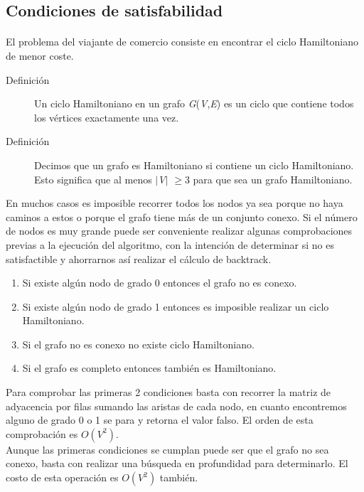 \documentclass[es]{ifirak}
\begin{document}
\subsection{Condiciones de satisfabilidad}
\large{
	\paragraph{}
	El problema del viajante de comercio consiste en encontrar el ciclo Hamiltoniano de menor coste.
	
	\begin{description}
		\item[Definición] Un ciclo Hamiltoniano en un grafo \textit{G}(\textit{V},\textit{E}) es un ciclo que contiene todos los vértices exactamente una vez.
		\item[Definición] Decimos que un grafo es Hamiltoniano si contiene un ciclo Hamiltoniano. Esto significa que al menos $|$\textit{V}$|$ $\geq$3 para que sea un grafo Hamiltoniano.\\
	\end{description}

	En muchos casos es imposible recorrer todos los nodos ya sea porque no haya caminos a estos o porque el grafo tiene más de un conjunto conexo. Si el número de nodos es muy grande puede ser conveniente realizar algunas comprobaciones previas a la ejecución del algoritmo, con la intención de determinar si no es satisfactible y ahorrarnos así realizar el cálculo de backtrack. 
	
	\begin{enumerate}
		\item Si existe algún nodo de grado 0 entonces el grafo no es conexo.
		\item Si existe algún nodo de grado 1 entonces es imposible realizar un ciclo Hamiltoniano.
		\item Si el grafo no es conexo no existe ciclo Hamiltoniano.
		\item Si el grafo es completo entonces también es Hamiltoniano.
	\end{enumerate}
	
	Para comprobar las primeras 2 condiciones basta con recorrer la matriz de adyacencia por filas sumando las aristas de cada nodo, en cuanto encontremos alguno de grado 0 o 1 se para y retorna el valor falso. El orden de esta comprobación es  $O(V^2)$.\\
	
	Aunque las primeras condiciones se cumplan puede ser que el grafo no sea conexo, basta con realizar una búsqueda en profundidad para determinarlo. El costo de esta operación es $O(V^2)$ también.\\
	
}
\end{document}
